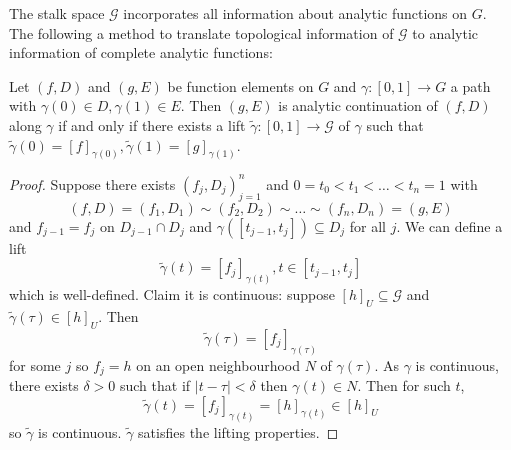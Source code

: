 \documentclass[a4paper]{article}
\begin{document}
The stalk space \(\mathcal G\) incorporates all information about analytic functions on \(G\). The following a method to translate topological information of \(\mathcal G\) to analytic information of complete analytic functions:

\begin{theorem}
  Let \((f, D)\) and \((g, E)\) be function elements on \(G\) and \(\gamma: [0, 1] \to G\) a path with \(\gamma(0) \in D, \gamma(1) \in E\). Then \((g, E)\) is analytic continuation of \((f, D)\) along \(\gamma\) if and only if there exists a lift \(\tilde \gamma: [0, 1] \to \mathcal G\) of \(\gamma\) such that \(\tilde \gamma(0) = [f]_{\gamma(0)}, \tilde \gamma(1) = [g]_{\gamma(1)}\).
\end{theorem}

\begin{proof}
  Suppose there exists \((f_j, D_j)_{j = 1}^n\) and \(0 = t_0 < t_1 < \dots < t_n = 1\) with
  \[
    (f, D) = (f_1, D_1) \sim (f_2, D_2) \sim \dots \sim (f_n, D_n) = (g, E)
  \]
  and \(f_{j - 1} = f_j\) on \(D_{j - 1} \cap D_j\) and \(\gamma([t_{j - 1}, t_j]) \subseteq D_j\) for all \(j\). We can define a lift
  \[
    \tilde \gamma(t) = [f_j]_{\gamma(t)}, t \in [t_{j - 1}, t_j]
  \]
  which is well-defined. Claim it is continuous: suppose \([h]_U \subseteq \mathcal G\) and \(\tilde \gamma(\tau) \in [h]_U\). Then
  \[
    \tilde \gamma(\tau) = [f_j]_{\gamma(\tau)}
  \]
  for some \(j\) so \(f_j = h\) on an open neighbourhood \(N\) of \(\gamma(\tau)\). As \(\gamma\) is continuous, there exists \(\delta > 0\) such that if \(|t - \tau| < \delta\) then \(\gamma(t) \in N\). Then for such \(t\),
  \[
    \tilde \gamma(t) = [f_j]_{\gamma(t)} = [h]_{\gamma(t)} \in [h]_U
  \]
  so \(\tilde \gamma\) is continuous. \(\tilde \gamma\) satisfies the lifting properties.


\end{proof}
\end{document}
